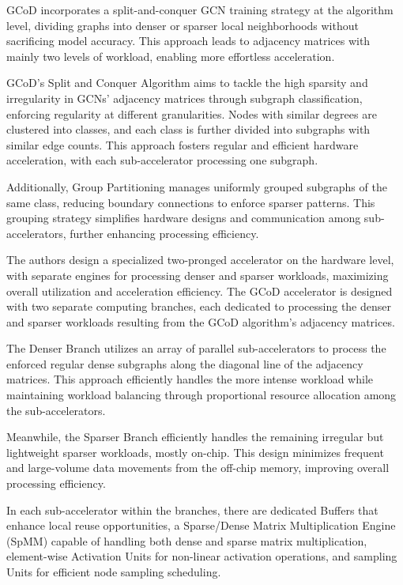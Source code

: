 GCoD incorporates a split-and-conquer GCN training strategy at the algorithm level, dividing graphs into denser or sparser local neighborhoods without sacrificing model accuracy.
This approach leads to adjacency matrices with mainly two levels of workload, enabling more effortless acceleration.

GCoD's Split and Conquer Algorithm aims to tackle the high sparsity and irregularity in GCNs' adjacency matrices through subgraph classification, enforcing regularity at different granularities.
Nodes with similar degrees are clustered into classes, and each class is further divided into subgraphs with similar edge counts.
This approach fosters regular and efficient hardware acceleration, with each sub-accelerator processing one subgraph.

Additionally, Group Partitioning manages uniformly grouped subgraphs of the same class, reducing boundary connections to enforce sparser patterns.
This grouping strategy simplifies hardware designs and communication among sub-accelerators, further enhancing processing efficiency.

The authors design a specialized two-pronged accelerator on the hardware level, with separate engines for processing denser and sparser workloads, maximizing overall utilization and acceleration efficiency.
The GCoD accelerator is designed with two separate computing branches, each dedicated to processing the denser and sparser workloads resulting from the GCoD algorithm's adjacency matrices.

The Denser Branch utilizes an array of parallel sub-accelerators to process the enforced regular dense subgraphs along the diagonal line of the adjacency matrices.
This approach efficiently handles the more intense workload while maintaining workload balancing through proportional resource allocation among the sub-accelerators.

Meanwhile, the Sparser Branch efficiently handles the remaining irregular but lightweight sparser workloads, mostly on-chip.
This design minimizes frequent and large-volume data movements from the off-chip memory, improving overall processing efficiency.

In each sub-accelerator within the branches, there are dedicated Buffers that enhance local reuse opportunities,
a Sparse/Dense Matrix Multiplication Engine (SpMM) capable of handling both dense and sparse matrix multiplication,
element-wise Activation Units for non-linear activation operations, and sampling Units for efficient node sampling scheduling.


